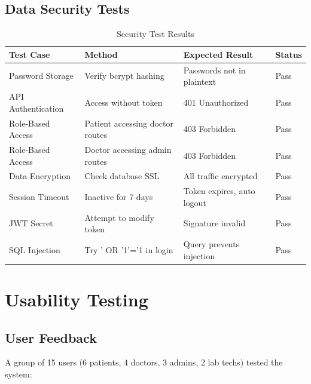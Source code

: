 \subsection{Data Security Tests}

\begin{table}[H]
    \centering
    \small
    \setlength{\tabcolsep}{3pt}
    \begin{tabular}{|p{2.5cm}|p{3.5cm}|p{2.2cm}|p{1.2cm}|}
        \hline
        \textbf{Test Case} & \textbf{Method} & \textbf{Expected Result} & \textbf{Status} \\
        \hline
        Password Storage & Verify bcrypt hashing & Passwords not in plaintext & Pass \\
        \hline
        API Authentication & Access without token & 401 Unauthorized & Pass \\
        \hline
        Role-Based Access & Patient accessing doctor routes & 403 Forbidden & Pass \\
        \hline
        Role-Based Access & Doctor accessing admin routes & 403 Forbidden & Pass \\
        \hline
        Data Encryption & Check database SSL & All traffic encrypted & Pass \\
        \hline
        Session Timeout & Inactive for 7 days & Token expires, auto logout & Pass \\
        \hline
        JWT Secret & Attempt to modify token & Signature invalid & Pass \\
        \hline
        SQL Injection & Try ' OR '1'='1 in login & Query prevents injection & Pass \\
        \hline
    \end{tabular}
    \caption{Security Test Results}
    \label{tab:security}
\end{table}

\section{Usability Testing}

\subsection{User Feedback}
A group of 15 users (6 patients, 4 doctors, 3 admins, 2 lab techs) tested the system:

